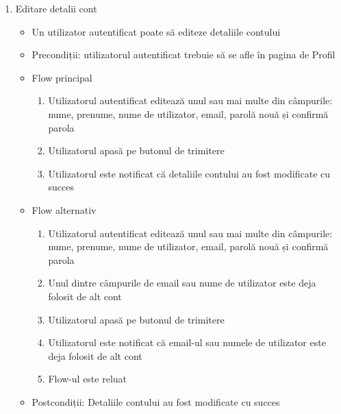 \begin{enumerate}
    \item Editare detalii cont
    \begin{itemize}
        \setlength\itemsep{0.5em}
        \item Un utilizator autentificat poate să editeze detaliile contului
        \item Precondiții: utilizatorul autentificat trebuie să se afle în pagina de Profil
        \item Flow principal
        \begin{enumerate}
            \setlength\itemsep{0.5em}
            \item Utilizatorul autentificat editează unul sau mai multe din câmpurile: nume, prenume, nume de utilizator, email, parolă nouă și confirmă parola
            \item Utilizatorul apasă pe butonul de trimitere
            \item Utilizatorul este notificat că detaliile contului au fost modificate cu succes
        \end{enumerate}
        \item Flow alternativ
        \begin{enumerate}
            \setlength\itemsep{0.5em}
            \item Utilizatorul autentificat editează unul sau mai multe din câmpurile: nume, prenume, nume de utilizator, email, parolă nouă și confirmă parola
            \item Unul dintre câmpurile de email sau nume de utilizator este deja folosit de alt cont
            \item Utilizatorul apasă pe butonul de trimitere
            \item Utilizatorul este notificat că email-ul sau numele de utilizator este deja folosit de alt cont
            \item Flow-ul este reluat
        \end{enumerate}
        \item Postcondiții: Detaliile contului au fost modificate cu succes
    \end{itemize}
  \end{enumerate}



